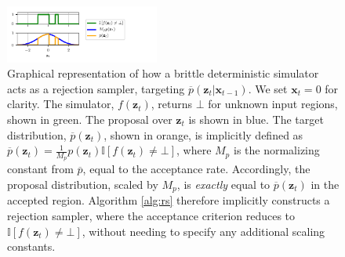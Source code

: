 \begin{figure}[t]
    \centering
    \includegraphics[width=0.45\textwidth]{figures/explanatory-plot.pdf}
    \vspace{-0.3cm}
    \caption{Graphical representation of how a brittle deterministic simulator acts as a rejection sampler, targeting $\overline{p}(\mathbf{z}_t | \mathbf{x}_{t-1})$.
    We set $\mathbf{x}_t = 0$ for clarity.
    The simulator, $f(\mathbf{z}_t)$, returns $\bot$ for unknown input regions, shown in green.
    The proposal over $\mathbf{z}_t$ is shown in blue.
    The target distribution, $\overline{p}(\mathbf{z}_t)$, shown in orange, is implicitly defined as $\overline{p}(\mathbf{z}_t) = \frac{1}{M_p} p(\mathbf{z}_t) \mathbb{I}\left[ f(\mathbf{z}_t) \neq \bot \right]$, where $M_p$ is the normalizing constant from $\overline{p}$, equal to the acceptance rate.
    Accordingly, the proposal distribution, scaled by $M_p$, is \emph{exactly} equal to $\overline{p}(\mathbf{z}_t)$ in the accepted region.
    Algorithm \ref{alg:rs} therefore implicitly constructs a rejection sampler, where the acceptance criterion reduces to $\mathbb{I}\left[ f(\mathbf{z}_t) \neq \bot \right]$, without needing to specify any additional scaling constants.
    }
    \label{fig:rs}
\end{figure}